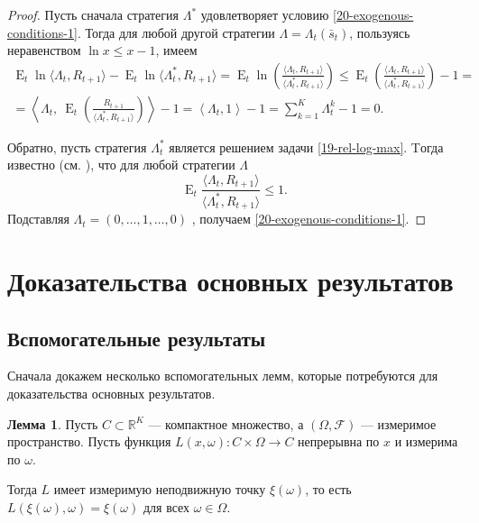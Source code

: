 \documentclass[a4paper,12pt,russian]{article} %
\theoremstyle{definition}
\newtheorem{lemma}{Лемма}
\DeclareMathOperator{\E}{E}
\newcommand{\F}{\mathcal{F}}
\newcommand{\R}{\mathbb{R}}
\begin{document}
\begin{proof}
Пусть сначала стратегия  $\Lambda^*$ удовлетворяет условию \eqref{20-exogenous-conditions-1}. Тогда для любой другой стратегии  $\Lambda = \Lambda_t(\bar s_t)$, пользуясь неравенством $\ln x \le x-1$, имеем
\begin{multline*}
\E_t \ln\langle\Lambda_t,R_{t+1}\rangle 
  - \E_t \ln\langle\Lambda_t^*,R_{t+1}\rangle
= \E_t\ln\left( 
  \frac{\langle\Lambda_t,R_{t+1}\rangle}
       {\langle\Lambda_t^*,R_{t+1}\rangle}
\right) 
\le \E_t\left( 
  \frac{\langle\Lambda_t,R_{t+1}\rangle}
       {\langle\Lambda_t^*,R_{t+1}\rangle}
\right) - 1 =\\
= \left\langle \Lambda_t,
  \ \E_t\left(\frac{R_{t+1}}{\langle\Lambda_t^*,R_{t+1}\rangle}\right) 
\right\rangle - 1
=  \left\langle \Lambda_t,
  1 \right\rangle - 1=
\sum_{k=1}^K \Lambda_{t}^k - 1 = 0.
\end{multline*}

Обратно, пусть стратегия $\Lambda_t^*$ является решением задачи \eqref{19-rel-log-max}. Tогда известно (см. \cite[Т.~1]{AlgoetCover1988}), что для любой стратегии $\Lambda$
\[
\E_t \frac{\langle \Lambda_t, R_{t+1}\rangle}{\langle \Lambda_t^*, R_{t+1}\rangle} \le 1.
\]
Подставляя $\Lambda_t = (0,\dots,1,\dots,0)$ , получаем \eqref{20-exogenous-conditions-1}. 
\end{proof}





\section{Доказательства основных результатов}
\label{section6-proofs}
\subsection{Вспомогательные результаты}
Сначала докажем несколько вспомогательных лемм, которые потребуются для доказательства основных результатов.


\begin{lemma}
\label{lemma1-fixed-point}
Пусть $C\subset\R^K$ — компактное множество, а $(\Omega,\F)$ — измеримое пространство.
Пусть функция $L(x,\omega)\colon C\times\Omega\to C$ непрерывна по $x$ и измерима по $\omega$.

Тогда $L$ имеет измеримую неподвижную точку $\xi(\omega)$, то есть \ $L(\xi(\omega),\omega) = \xi(\omega)$ для всех $\omega\in\Omega$. 
\end{lemma}
\end{document}
